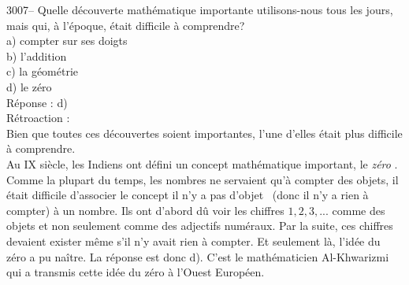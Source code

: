 \documentclass[letterpaper, 12pt]{article}
\begin{document}
3007-- Quelle d\'ecouverte math\'ematique importante utilisons-nous tous les jours, mais qui, \`a l'\'epoque, \'etait difficile \`a comprendre?\\

a) compter sur ses doigts\\
b) l'addition\\
c) la g\'eom\'etrie\\
d) le z\'ero\\

R\'eponse : d)\\

R\'etroaction :\\
Bien que toutes ces d\'ecouvertes soient importantes, l'une d'elles \'etait plus difficile \`a comprendre.\\
Au {\scriptsize IX\ieme{}} si\`ecle, les Indiens ont d\'efini un concept math\'ematique important, le \og \emph{z\'ero} \fg. Comme la plupart du temps, les nombres ne servaient qu'\`a compter des objets, il \'etait difficile d'associer le concept \og il n'y a pas d'objet \fg \ (donc il n'y a rien \`a compter) \`a un nombre. Ils ont d'abord d\^u voir les chiffres $1, 2, 3, ...$ comme des objets et non seulement comme des adjectifs num\'eraux. Par la suite, ces chiffres devaient exister m\^eme s'il n'y avait rien \`a compter. Et seulement l\`a, l'id\'ee du z\'ero a pu na\^itre. La r\'eponse est donc d). C'est le math\'ematicien Al-Khwarizmi qui a transmis cette id\'ee du z\'ero \`a l'Ouest Europ\'een.
\end{document}
